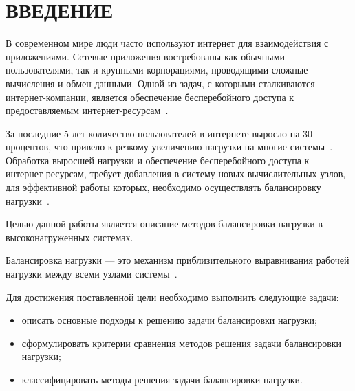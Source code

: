 \chapter*{ВВЕДЕНИЕ}

В современном мире люди часто используют интернет для взаимодействия с приложениями.
Сетевые приложения востребованы как обычными пользователями, так и крупными корпорациями, проводящими сложные вычисления и обмен данными.
Одной из задач, с которыми сталкиваются интернет-компании, является обеспечение бесперебойного доступа к предоставляемым интернет-ресурсам~\cite{webact}.

За последние 5 лет количество пользователей в интернете выросло на 30 процентов, что привело к резкому увеличению нагрузки на многие системы~\cite{statistics}.
Обработка выросшей нагрузки и обеспечение бесперебойного доступа к интернет-ресурсам, требует добавления в систему новых вычислительных узлов, для эффективной работы которых, необходимо осуществлять балансировку нагрузки~\cite{strategies, com_analysis, gaud, part_algos}.

Целью данной работы является описание методов балансировки нагрузки в высоконагруженных системах.

Балансировка нагрузки --- это механизм приблизительного выравнивания рабочей нагрузки между всеми узлами системы~\cite{anal, gaud}.

Для достижения поставленной цели необходимо выполнить следующие задачи:
\begin{itemize}
	\item описать основные подходы к решению задачи балансировки нагрузки;
	\item сформулировать критерии сравнения методов решения задачи балансировки нагрузки;
	\item классифицировать методы решения задачи балансировки нагрузки.
\end{itemize}

